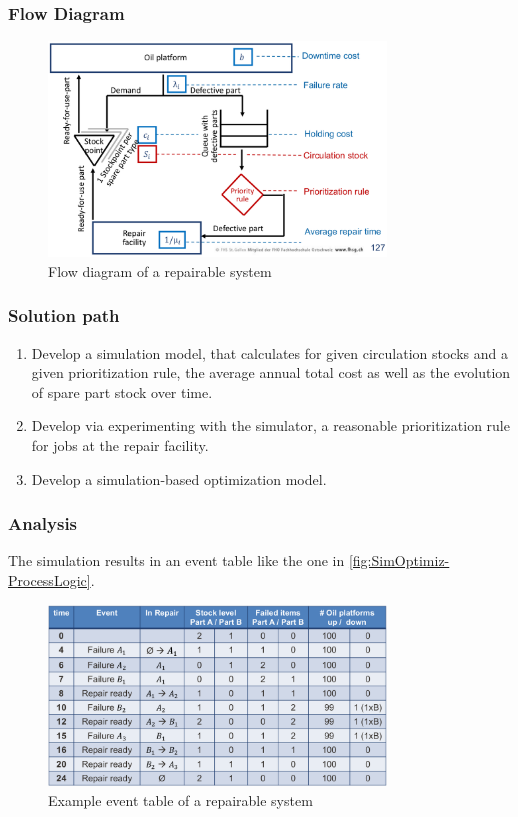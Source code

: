 \subsubsection{Flow Diagram}
\begin{figure}[H]
	\centering
	\includegraphics[width=0.8\textwidth]{figures/RepairableSystemDES.png}
	\caption{Flow diagram of a repairable system}
\end{figure}

\subsubsection{Solution path}

\begin{enumerate}
	\tightlist
	\item Develop a simulation model, that calculates for given circulation
	stocks and a given prioritization rule, the average annual total cost
	as well as the evolution of spare part stock over time.
	\item Develop via experimenting with the simulator, a reasonable
	prioritization rule for jobs at the repair facility.
	\item Develop a simulation-based optimization model.
\end{enumerate}

\subsubsection{Analysis}

The simulation results in an event table like the one in
\autoref{fig:SimOptimiz-ProcessLogic}.
\begin{figure}[H]
	\centering
	\includegraphics[width=0.8\textwidth]{figures/SimOptimiz_ProcessLogic.png}
	\caption{Example event table of a repairable system}
	\label{fig:SimOptimiz-ProcessLogic}
\end{figure}

